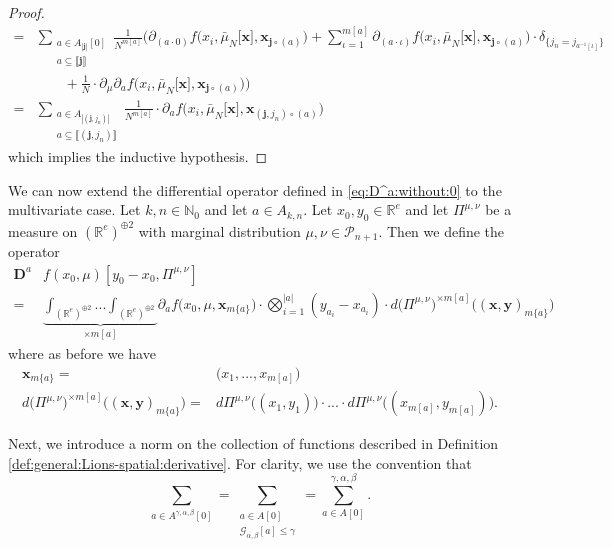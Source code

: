 \documentclass[a4paper,11pt,twoside]{article}
\numberwithin{equation}{section}
\theoremstyle{plain}
\newcommand{\bN}{\mathbb{N}}
\newcommand{\bR}{\mathbb{R}}
\newcommand{\cP}{\mathcal{P}}
\newcommand{\scG}{\mathscr{G}}
\newcommand{\rD}{\mathbf{D}}
\newcommand{\1}{\mathbbm{1}}
\begin{document}
\begin{proof}
\begin{align*}
			=& \sum_{\substack{a \in A_{|\boldsymbol{j}|}[0] \\ a \subseteq \llbracket \boldsymbol{j} \rrbracket}} \tfrac{1}{N^{m[a]}} \bigg( \partial_{(a\cdot 0)} f\Big( x_i, \bar{\mu}_N\big[ \boldsymbol{x} \big], \boldsymbol{x}_{\boldsymbol{j}\circ(a)} \Big) + \sum_{\iota=1}^{m[a]} \partial_{(a\cdot \iota)} f\Big( x_i, \bar{\mu}_N\big[ \boldsymbol{x} \big], \boldsymbol{x}_{\boldsymbol{j}\circ(a)} \Big)\cdot \delta_{\{ j_n = j_{a^{-1}[\iota]} \}} 
			\\
			&\qquad + \tfrac{1}{N} \cdot \partial_\mu \partial_a f \Big(x_i, \bar{\mu}_N \big[ \boldsymbol{x} \big], \boldsymbol{x}_{\boldsymbol{j}\circ(a)} \Big)\bigg)
			\\
			=& \sum_{\substack{a \in A_{|(\boldsymbol{j}, j_n)|} \\ a\subseteq \llbracket (\boldsymbol{j}, j_n) \rrbracket}} \tfrac{1}{N^{m[a]}} \cdot \partial_a f\Big( x_i, \bar{\mu}_N\big[ \boldsymbol{x} \big], \boldsymbol{x}_{(\boldsymbol{j}, j_n)\circ(a)} \Big)
		\end{align*}
		which implies the inductive hypothesis. 
	\end{proof}
	
	We can now extend the differential operator defined in \eqref{eq:D^a:without:0} to the multivariate case. Let $k, n \in \bN_0$ and let $a\in A_{k, n}$. Let $x_0, y_0\in \bR^e$ and let $\Pi^{\mu, \nu}$ be a measure on $(\bR^e)^{\oplus 2}$ with marginal distribution $\mu, \nu \in \cP_{n+1}$. Then we define the operator
	\begin{align}
		\nonumber
		\rD^a& f(x_0, \mu)[ y_0-x_0, \Pi^{\mu, \nu}]
		\\
		\label{eq:rDa}
		=& \underbrace{\int_{(\bR^e)^{\oplus 2}} ... \int_{(\bR^e)^{\oplus 2}} }_{\times m[a]} \partial_a f\Big( x_0, \mu, \boldsymbol{x}_{m\{a\}} \Big) \cdot \bigotimes_{i=1}^{|a|} ( y_{a_i} - x_{a_i}) \cdot d\big( \Pi^{\mu, \nu}\big)^{\times m[a]} \Big( (\boldsymbol{x}, \boldsymbol{y})_{m\{a\}}\Big)
	\end{align}
	where as before we have
	\begin{align*}
		\boldsymbol{x}_{m\{a\}} =& \big( x_1, ..., x_{m[a]} \big)
		\\
		d\big( \Pi^{\mu, \nu}\big)^{\times m[a]} \Big( (\boldsymbol{x}, \boldsymbol{y})_{m\{a\}}\Big) =& d \Pi^{\mu, \nu}\big( (x_1, y_1) \big) \cdot ... \cdot d \Pi^{\mu, \nu}\big( (x_{m[a]}, y_{m[a]}) \big). 
	\end{align*}
	
	Next, we introduce a norm on the collection of functions described in Definition \ref{def:general:Lions-spatial:derivative}. For clarity, we use the convention that
	$$
	\sum_{a \in A^{\gamma, \alpha, \beta}[0]} = \sum_{\substack{ a\in A[0] \\ \scG_{\alpha, \beta}[a] \leq \gamma }} = \sum_{a \in A[0]}^{\gamma, \alpha, \beta}. 
	$$
	
\end{document}

